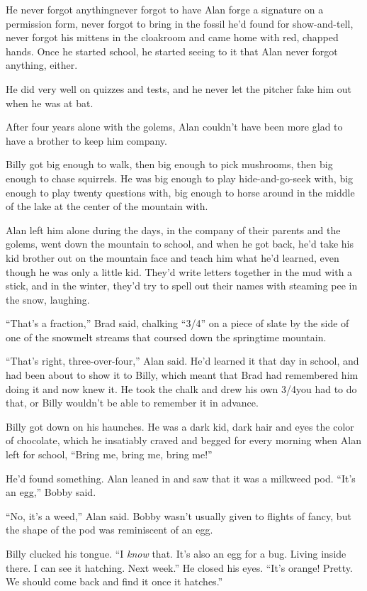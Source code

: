 He never forgot anything\dash{}never forgot to have Alan forge a signature
on a permission form, never forgot to bring in the fossil he'd found
for show-and-tell, never forgot his mittens in the cloakroom and came
home with red, chapped hands.  Once he started school, he started
seeing to it that Alan never forgot anything, either.

He did very well on quizzes and tests, and he never let the pitcher
fake him out when he was at bat.

After four years alone with the golems, Alan couldn't have been more
glad to have a brother to keep him company.

Billy got big enough to walk, then big enough to pick mushrooms, then
big enough to chase squirrels.  He was big enough to play
hide-and-go-seek with, big enough to play twenty questions with, big
enough to horse around in the middle of the lake at the center of the
mountain with.

Alan left him alone during the days, in the company of their parents
and the golems, went down the mountain to school, and when he got
back, he'd take his kid brother out on the mountain face and teach him
what he'd learned, even though he was only a little kid.  They'd write
letters together in the mud with a stick, and in the winter, they'd
try to spell out their names with steaming pee in the snow, laughing.

``That's a fraction,'' Brad said, chalking ``3/4'' on a piece of slate
by the side of one of the snowmelt streams that coursed down the
springtime mountain.

``That's right, three-over-four,'' Alan said.  He'd learned it that
day in school, and had been about to show it to Billy, which meant
that Brad had remembered him doing it and now knew it.  He took the
chalk and drew his own 3/4\dash{}you had to do that, or Billy wouldn't be
able to remember it in advance.

Billy got down on his haunches.  He was a dark kid, dark hair and eyes
the color of chocolate, which he insatiably craved and begged for
every morning when Alan left for school, ``Bring me, bring me, bring
me!''

He'd found something.  Alan leaned in and saw that it was a milkweed
pod.  ``It's an egg,'' Bobby said.

``No, it's a weed,'' Alan said.  Bobby wasn't usually given to flights
of fancy, but the shape of the pod was reminiscent of an egg.

Billy clucked his tongue.  ``I \textit{know} that.  It's also an egg
for a bug.  Living inside there.  I can see it hatching.  Next week.''
He closed his eyes.  ``It's orange!  Pretty.  We should come back and
find it once it hatches.''

